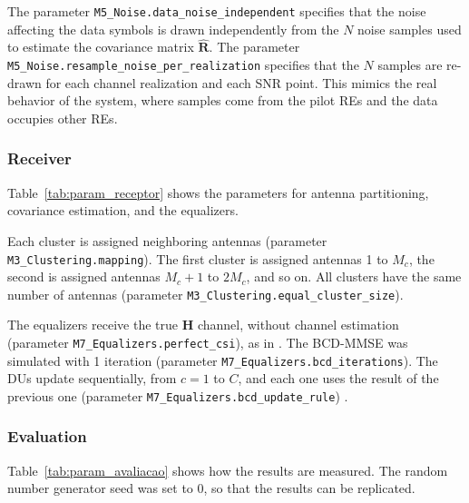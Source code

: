 The parameter \texttt{M5\_\allowbreak{}Noise.\allowbreak{}data\_\allowbreak{}noise\_\allowbreak{}independent} specifies that the noise affecting the data symbols is drawn independently from the $N$ noise samples used to estimate the covariance matrix $\hat{\mathbf{R}}$. The parameter \texttt{M5\_\allowbreak{}Noise.\allowbreak{}resample\_\allowbreak{}noise\_\allowbreak{}per\_\allowbreak{}realization} specifies that the $N$ samples are re-drawn for each channel realization and each SNR point. This mimics the real behavior of the system, where samples come from the pilot REs and the data occupies other REs.

\subsubsection{Receiver}\label{subsec:setup_receptor}

Table~\ref{tab:param_receptor} shows the parameters for antenna partitioning, covariance estimation, and the equalizers.


Each cluster is assigned neighboring antennas (parameter \texttt{M3\_\allowbreak{}Clustering.\allowbreak{}mapping}). The first cluster is assigned antennas 1 to $M_c$, the second is assigned antennas $M_c+1$ to $2M_c$, and so on. All clusters have the same number of antennas (parameter \texttt{M3\_\allowbreak{}Clustering.\allowbreak{}equal\_\allowbreak{}cluster\_\allowbreak{}size}).

The equalizers receive the true $\mathbf{H}$ channel, without channel estimation (parameter \texttt{M7\_\allowbreak{}Equalizers.\allowbreak{}perfect\_\allowbreak{}csi}), as in \cite{zhao2025jsac}. The BCD-MMSE was simulated with 1 iteration (parameter \texttt{M7\_\allowbreak{}Equalizers.\allowbreak{}bcd\_\allowbreak{}iterations}). The DUs update sequentially, from $c = 1$ to $C$, and each one uses the result of the previous one (parameter \texttt{M7\_\allowbreak{}Equalizers.\allowbreak{}bcd\_\allowbreak{}update\_\allowbreak{}rule}) \cite{zhao2025jsac}.



\subsubsection{Evaluation}\label{subsec:setup_avaliacao}

Table~\ref{tab:param_avaliacao} shows how the results are measured.
The random number generator seed was set to 0, so that the results can be replicated.

